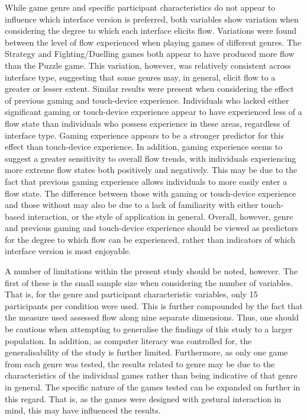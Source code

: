 While game genre and specific participant characteristics do not appear to influence which interface version is preferred, both variables show variation when considering the degree to which each interface elicits flow. Variations were found between the level of flow experienced when playing games of different genres. The Strategy and Fighting/Duelling games both appear to have produced more flow than the Puzzle game. This variation, however, was relatively consistent across interface type, suggesting that some genres may, in general, elicit flow to a greater or lesser extent. Similar results were present when considering the effect of previous gaming and touch-device experience. Individuals who lacked either significant gaming or touch-device experience appear to have experienced less of a flow state than individuals who possess experience in these areas, regardless of interface type. Gaming experience appears to be a stronger predictor for this effect than touch-device experience. In addition, gaming experience seems to suggest a greater sensitivity to overall flow trends, with individuals experiencing more extreme flow states both positively and negatively. This may be due to the fact that previous gaming experience allows individuals to more easily enter a flow state. The difference between those with gaming or touch-device experience and those without may also be due to a lack of familiarity with either touch-based interaction, or the style of application in general. Overall, however, genre and previous gaming and touch-device experience should be viewed as predictors for the degree to which flow can be experienced, rather than indicators of which interface version is most enjoyable.

A number of limitations within the present study should be noted, however. The first of these is the small sample size when considering the number of variables. That is, for the genre and participant characteristic variables, only 15 participants per condition were used. This is further compounded by the fact that the measure used assessed flow along nine separate dimensions. Thus, one should be cautious when attempting to generalise the findings of this study to a larger population. In addition, as computer literacy was controlled for, the generalisability of the study is further limited. Furthermore, as only one game from each genre was tested, the results related to genre may be due to the characteristics of the individual games rather than being indicative of that genre in general. The specific nature of the games tested can be expanded on further in this regard. That is, as the games were designed with gestural interaction in mind, this may have influenced the results.

